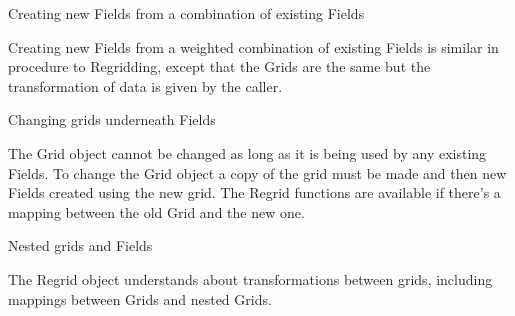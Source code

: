 \begin{description}
\item{Creating new Fields from a combination of existing Fields}

Creating new Fields from a weighted combination of existing
Fields is similar in procedure to Regridding, except that the
Grids are the same but the transformation of data is given 
by the caller.

\item{Changing grids underneath Fields}

The Grid object cannot be changed as long as it is being used
by any existing Fields.  To change the Grid object a copy of
the grid must be made and then new Fields created using the
new grid.  The Regrid functions are available if there's a 
mapping between the old Grid and the new one.

\item{Nested grids and Fields}

The Regrid object understands about transformations between
grids, including mappings between Grids and nested Grids.

\end{description}
